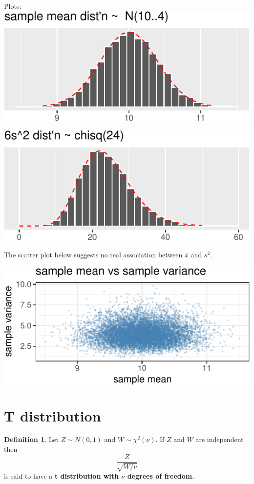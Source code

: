 \documentclass[
]{book}
\theoremstyle{definition}
\newtheorem{definition}{Definition}[chapter]
\theoremstyle{definition}
\theoremstyle{definition}
\theoremstyle{definition}
\theoremstyle{remark}
\begin{document}
Plots:
\includegraphics{math340-notes_files/figure-latex/unnamed-chunk-27-1.pdf}

\includegraphics{math340-notes_files/figure-latex/unnamed-chunk-28-1.pdf}

The scatter plot below suggests no real association between \(\overline{x}\) and \(s^2\).

\includegraphics{math340-notes_files/figure-latex/unnamed-chunk-29-1.pdf}

\section{T distribution}\label{t-distribution}

\begin{definition}
\protect\hypertarget{def:t-distribution}{}\label{def:t-distribution}Let \(Z \sim N(0,1)\) and \(W \sim \chi^2(\nu)\). If \(Z\) and \(W\) are independent then \[\frac{Z}{\sqrt{W/\nu}}\] is said to have a \textbf{t distribution with \(\nu\) degrees of freedom.}
\end{definition}
\end{document}
